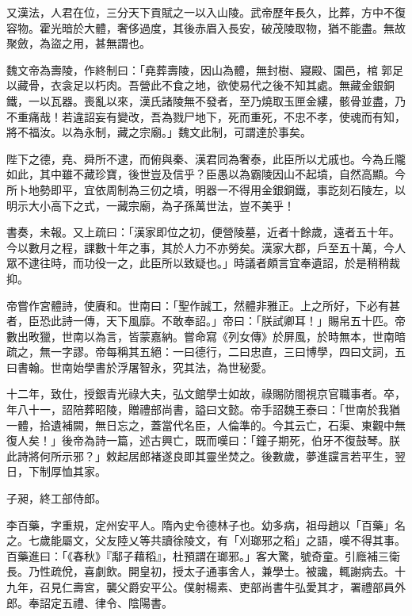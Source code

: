 \begin{pinyinscope}
 又漢法，人君在位，三分天下貢賦之一以入山陵。武帝歷年長久，比葬，方中不復容物。霍光暗於大體，奢侈過度，其後赤眉入長安，破茂陵取物，猶不能盡。無故聚斂，為盜之用，甚無謂也。



 魏文帝為壽陵，作終制曰：「堯葬壽陵，因山為體，無封樹、寢殿、園邑，棺郭足以藏骨，衣衾足以朽肉。吾營此不食之地，欲使易代之後不知其處。無藏金銀銅鐵，一以瓦器。喪亂以來，漢氏諸陵無不發者，至乃燒取玉匣金縷，骸骨並盡，乃不重痛哉！若違詔妄有變改，吾為戮尸地下，死而重死，不忠不孝，使魂而有知，將不福汝。以為永制，藏之宗廟。」魏文此制，可謂達於事矣。



 陛下之德，堯、舜所不逮，而俯與秦、漢君同為奢泰，此臣所以尤戚也。今為丘隴如此，其中雖不藏珍寶，後世豈及信乎？臣愚以為霸陵因山不起墳，自然高顯。今所卜地勢即平，宜依周制為三仞之墳，明器一不得用金銀銅鐵，事訖刻石陵左，以明示大小高下之式，一藏宗廟，為子孫萬世法，豈不美乎！



 書奏，未報。又上疏曰：「漢家即位之初，便營陵墓，近者十餘歲，遠者五十年。今以數月之程，課數十年之事，其於人力不亦勞矣。漢家大郡，戶至五十萬，今人眾不逮往時，而功役一之，此臣所以致疑也。」時議者頗言宜奉遺詔，於是稍稍裁抑。



 帝嘗作宮體詩，使賡和。世南曰：「聖作誠工，然體非雅正。上之所好，下必有甚者，臣恐此詩一傳，天下風靡。不敢奉詔。」帝曰：「朕試卿耳！」賜帛五十匹。帝數出畋獵，世南以為言，皆蒙嘉納。嘗命寫《列女傳》於屏風，於時無本，世南暗疏之，無一字謬。帝每稱其五絕：一曰德行，二曰忠直，三曰博學，四曰文詞，五曰書翰。世南始學書於浮屠智永，究其法，為世秘愛。



 十二年，致仕，授銀青光祿大夫，弘文館學士如故，祿賜防閤視京官職事者。卒，年八十一，詔陪葬昭陵，贈禮部尚書，謚曰文懿。帝手詔魏王泰曰：「世南於我猶一體，拾遺補闕，無日忘之，蓋當代名臣，人倫準的。今其云亡，石渠、東觀中無復人矣！」後帝為詩一篇，述古興亡，既而嘆曰：「鐘子期死，伯牙不復鼓琴。朕此詩將何所示邪？」敕起居郎褚遂良即其靈坐焚之。後數歲，夢進讜言若平生，翌日，下制厚恤其家。



 子昶，終工部侍郎。



 李百藥，字重規，定州安平人。隋內史令德林子也。幼多病，祖母趙以「百藥」名之。七歲能屬文，父友陸乂等共讀徐陵文，有「刈瑯邪之稻」之語，嘆不得其事。百藥進曰：「《春秋》『鄅子藉稻』，杜預謂在瑯邪。」客大驚，號奇童。引廕補三衛長。乃性疏侻，喜劇飲。開皇初，授太子通事舍人，兼學士。被讒，輒謝病去。十九年，召見仁壽宮，襲父爵安平公。僕射楊素、吏部尚書牛弘愛其才，署禮部員外郎。奉詔定五禮、律令、陰陽書。




\end{pinyinscope}

